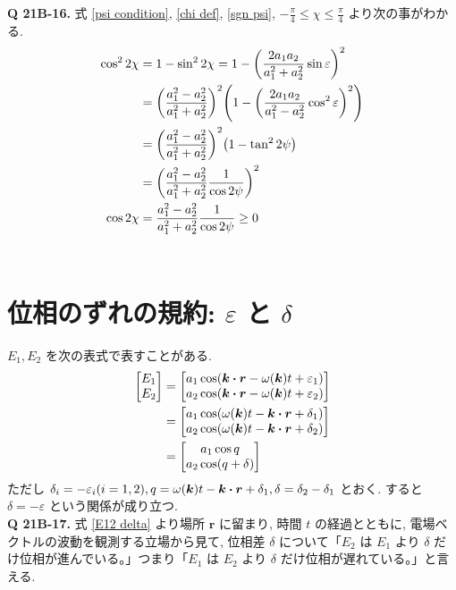 \documentclass[uplatex,dvipdfmx,a4paper,11pt]{jlreq}
\newcommand{\rr}{\bm{r}}
\newcommand{\kk}{\bm{k}}
\theoremstyle{definition}
\begin{document}
\textbf{Q 21B-16.}
式 \eqref{psi condition}, \eqref{chi def}, \eqref{sgn psi}, $-\frac{\pi}{4} \leq \chi \leq \frac{\pi}{4}$ より次の事がわかる.
\begin{align}
  \cos^22\chi & = 1 - \sin^22\chi = 1 - \qty(\frac{2a_1a_2}{a_1^2 + a_2^2}\sin\varepsilon)^2                                  \\
              & = \qty(\frac{a_1^2 - a_2^2}{a_1^2 + a_2^2})^2\qty(1 - \qty(\frac{2a_1a_2}{a_1^2 - a_2^2}\cos^2\varepsilon)^2) \\
              & = \qty(\frac{a_1^2 - a_2^2}{a_1^2 + a_2^2})^2\qty(1 - \tan^22\psi)                                            \\
              & = \qty(\frac{a_1^2 - a_2^2}{a_1^2 + a_2^2}\frac{1}{\cos2\psi})^2                                              \\
  \cos2\chi   & = \frac{a_1^2 - a_2^2}{a_1^2 + a_2^2}\frac{1}{\cos2\psi} \geq 0 \label{cos 2chi}
\end{align} \\

\section{位相のずれの規約: $\varepsilon$ と $\delta$}
$E_1, E_2$ を次の表式で表すことがある.
\begin{align}
  \mqty[E_1                                                 \\ E_2] &= \mqty[a_1\cos(\kk\vdot\rr - \omega(\kk)t + \varepsilon_1) \\ a_2\cos(\kk\vdot\rr - \omega(\kk)t + \varepsilon_2)] \\
   & = \mqty[a_1\cos(\omega(\kk)t - \kk\vdot\rr + \delta_1) \\ a_2\cos(\omega(\kk)t - \kk\vdot\rr + \delta_2)] \\
   & = \mqty[a_1\cos q                                      \\ a_2\cos(q + \delta)] \label{E12 delta}
\end{align}
ただし $\delta_i = - \varepsilon_i (i = 1, 2), q = \omega(\kk)t - \kk\vdot\rr + \delta_1, \delta = \delta_2 - \delta_1$ とおく. すると $\delta = -\varepsilon$ という関係が成り立つ. \\

\textbf{Q 21B-17.}
式 \eqref{E12 delta} より場所 $\rr$ に留まり, 時間 $t$ の経過とともに, 電場ベクトルの波動を観測する立場から見て, 位相差 $\delta$ について「$E_2$ は $E_1$ より $\delta$ だけ位相が進んでいる。」つまり「$E_1$ は $E_2$ より $\delta$ だけ位相が遅れている。」と言える.
\end{document}
